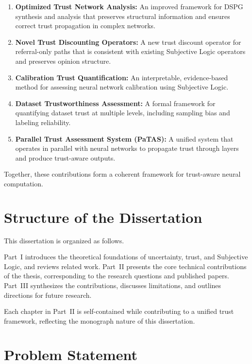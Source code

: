 \begin{enumerate}
    \item \textbf{Optimized Trust Network Analysis:} An improved framework for DSPG synthesis and analysis that preserves structural information and ensures correct trust propagation in complex networks.
    
    \item \textbf{Novel Trust Discounting Operators:} A new trust discount operator for referral-only paths that is consistent with existing Subjective Logic operators and preserves opinion structure.
    
    \item \textbf{Calibration Trust Quantification:} An interpretable, evidence-based method for assessing neural network calibration using Subjective Logic.
    
    \item \textbf{Dataset Trustworthiness Assessment:} A formal framework for quantifying dataset trust at multiple levels, including sampling bias and labeling reliability.
    
    \item \textbf{Parallel Trust Assessment System (PaTAS):} A unified system that operates in parallel with neural networks to propagate trust through layers and produce trust-aware outputs.
\end{enumerate}

Together, these contributions form a coherent framework for trust-aware neural computation.


\section{Structure of the Dissertation}
\label{sec:structure}

This dissertation is organized as follows.

Part~I introduces the theoretical foundations of uncertainty, trust, and Subjective Logic, and reviews related work.  
Part~II presents the core technical contributions of the thesis, corresponding to the research questions and published papers.  
Part~III synthesizes the contributions, discusses limitations, and outlines directions for future research.

Each chapter in Part~II is self-contained while contributing to a unified trust framework, reflecting the monograph nature of this dissertation.


\section{Problem Statement}
\lipsum[1]
